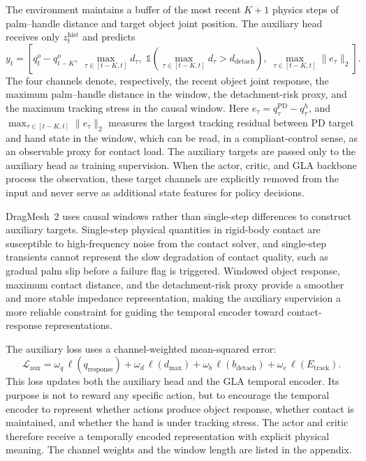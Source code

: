 The environment maintains a buffer of the most recent $K+1$ physics
steps of palm--handle distance and target object joint position. The
auxiliary head receives only $z_t^{\mathrm{hist}}$ and predicts
\begin{equation}
y_t = \left[
q_t^o-q_{t-K}^o,\;
\max_{\tau\in[t-K,t]}d_\tau,\;
\mathbb{1}\!\left(\max_{\tau\in[t-K,t]}d_\tau>d_{\mathrm{detach}}\right),\;
\max_{\tau\in[t-K,t]}\lVert e_\tau\rVert_2
\right].
\label{eq:aux}
\end{equation}
The four channels denote, respectively, the recent object joint
response, the maximum palm--handle distance in the window, the
detachment-risk proxy, and the maximum tracking stress in the
causal window. Here $e_\tau = q_\tau^{\mathrm{PD}} - q_\tau^h$, and
$\max_{\tau\in[t-K,t]}\lVert e_\tau\rVert_2$ measures the largest
tracking residual between PD target and hand state in the window,
which can be read, in a compliant-control sense, as an observable
proxy for contact load. The auxiliary targets are passed only to the
auxiliary head as training supervision. When the actor, critic, and
GLA backbone process the observation, these target channels are
explicitly removed from the input and never serve as additional
state features for policy decisions.

DragMesh~2 uses causal windows rather than single-step differences
to construct auxiliary targets. Single-step physical quantities in
rigid-body contact are susceptible to high-frequency noise from the
contact solver, and single-step transients cannot represent the slow
degradation of contact quality, such as gradual palm slip before a
failure flag is triggered. Windowed object response, maximum contact
distance, and the detachment-risk proxy provide a smoother and more
stable impedance representation, making the auxiliary supervision a
more reliable constraint for guiding the temporal encoder toward
contact-response representations.

The auxiliary loss uses a channel-weighted mean-squared error:
\begin{equation}
\mathcal{L}_{\mathrm{aux}} =
\omega_q\,\ell(q_{\mathrm{response}})
+ \omega_d\,\ell(d_{\max})
+ \omega_b\,\ell(b_{\mathrm{detach}})
+ \omega_e\,\ell(E_{\mathrm{track}}).
\label{eq:laux}
\end{equation}
This loss updates both the auxiliary head and the GLA temporal
encoder. Its purpose is not to reward any specific action, but to
encourage the temporal encoder to represent whether actions produce
object response, whether contact is maintained, and whether the hand
is under tracking stress. The actor and critic therefore receive a
temporally encoded representation with explicit physical meaning.
The channel weights and the window length are listed in the
appendix.



